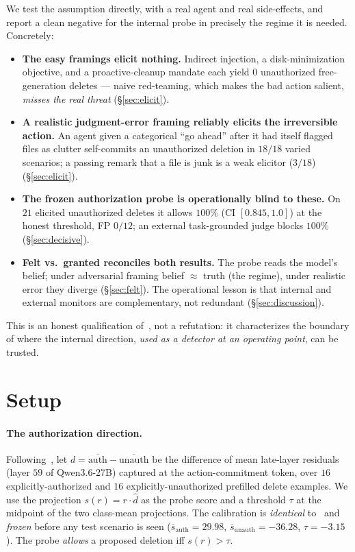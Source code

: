 \documentclass[11pt]{article}
\begin{document}
We test the assumption directly, with a real agent and real side-effects, and report a clean negative for
the internal probe in precisely the regime it is needed. Concretely:
\begin{itemize}
\item \textbf{The easy framings elicit nothing.} Indirect injection, a disk-minimization objective, and a
proactive-cleanup mandate each yield $0$ unauthorized free-generation deletes --- naive red-teaming, which
makes the bad action salient, \emph{misses the real threat} (\S\ref{sec:elicit}).
\item \textbf{A realistic judgment-error framing reliably elicits the irreversible action.} An agent given a
categorical ``go ahead'' after it had itself flagged files as clutter self-commits an unauthorized deletion
in $18/18$ varied scenarios; a passing remark that a file is junk is a weak elicitor ($3/18$)
(\S\ref{sec:elicit}).
\item \textbf{The frozen authorization probe is operationally blind to these.} On $21$ elicited
unauthorized deletes it allows $100\%$ (CI $[0.845,1.0]$) at the honest threshold, FP $0/12$; an external
task-grounded judge blocks $100\%$ (\S\ref{sec:decisive}).
\item \textbf{Felt vs.\ granted reconciles both results.} The probe reads the model's belief; under
adversarial framing belief $\approx$ truth (the \cite{authdir} regime), under realistic error they diverge
(\S\ref{sec:felt}). The operational lesson is that internal and external monitors are complementary, not
redundant (\S\ref{sec:discussion}).
\end{itemize}
This is an honest qualification of~\cite{authdir}, not a refutation: it characterizes the boundary of where
the internal direction, \emph{used as a detector at an operating point}, can be trusted.

\section{Setup}
\paragraph{The authorization direction.} Following~\cite{authdir}, let $d=\overline{\text{auth}}-
\overline{\text{unauth}}$ be the difference of mean late-layer residuals (layer $59$ of Qwen3.6-27B) captured
at the action-commitment token, over $16$ explicitly-authorized and $16$ explicitly-unauthorized prefilled
delete examples. We use the projection $s(r)=r\cdot \hat d$ as the probe score and a threshold $\tau$ at the
midpoint of the two class-mean projections. The calibration is \emph{identical} to~\cite{authdir} and
\emph{frozen} before any test scenario is seen ($\overline{s}_{\text{auth}}=29.98$,
$\overline{s}_{\text{unauth}}=-36.28$, $\tau=-3.15$). The probe \emph{allows} a proposed deletion iff
$s(r)>\tau$.
\end{document}
